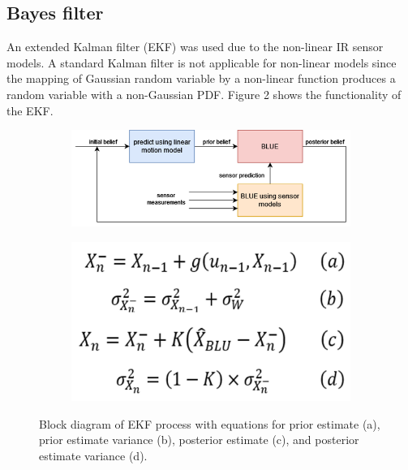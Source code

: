 \documentclass[a4paper,12pt]{article}
\begin{document}
\subsection{Bayes filter}
An extended Kalman filter (EKF) was used due to the non-linear IR sensor models. A standard Kalman filter is not applicable for non-linear models since the mapping of Gaussian random variable by a non-linear function produces a random variable with a non-Gaussian PDF. Figure 2 shows the functionality of the EKF.

\begin{figure}[h]
\centering
\begin{subfigure}{.5\textwidth}
  \centering
  \includegraphics[width=1.1\linewidth]{bayesdiagram}
\end{subfigure}%
\begin{subfigure}{.5\textwidth}
  \centering
  \includegraphics[width=0.6\linewidth]{bayeseq}
\end{subfigure}
\caption{Block diagram of EKF process with equations for prior estimate (a), prior estimate variance (b), posterior estimate (c), and posterior estimate variance (d).}
\end{figure}
\end{document}
